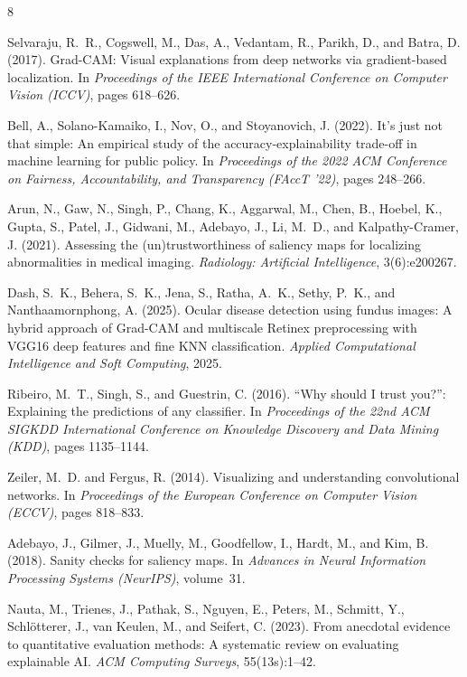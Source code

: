 \documentclass[12pt]{article}
\begin{document}
\begin{thebibliography}{8}

Selvaraju, R.~R., Cogswell, M., Das, A., Vedantam, R., Parikh, D., and
  Batra, D. (2017).
\newblock Grad-CAM: Visual explanations from deep networks via gradient-based
  localization.
\newblock In \emph{Proceedings of the IEEE International Conference on
  Computer Vision (ICCV)}, pages 618--626.

Bell, A., Solano-Kamaiko, I., Nov, O., and Stoyanovich, J. (2022).
\newblock It's just not that simple: An empirical study of the
  accuracy-explainability trade-off in machine learning for public policy.
\newblock In \emph{Proceedings of the 2022 ACM Conference on Fairness,
  Accountability, and Transparency (FAccT '22)}, pages 248--266.

Arun, N., Gaw, N., Singh, P., Chang, K., Aggarwal, M., Chen, B., Hoebel, K.,
  Gupta, S., Patel, J., Gidwani, M., Adebayo, J., Li, M.~D., and
  Kalpathy-Cramer, J. (2021).
\newblock Assessing the (un)trustworthiness of saliency maps for localizing
  abnormalities in medical imaging.
\newblock \emph{Radiology: Artificial Intelligence}, 3(6):e200267.

Dash, S.~K., Behera, S.~K., Jena, S., Ratha, A.~K., Sethy, P.~K., and
  Nanthaamornphong, A. (2025).
\newblock Ocular disease detection using fundus images: A hybrid approach of
  Grad-CAM and multiscale Retinex preprocessing with VGG16 deep features and
  fine KNN classification.
\newblock \emph{Applied Computational Intelligence and Soft Computing},
  2025.

Ribeiro, M.~T., Singh, S., and Guestrin, C. (2016).
\newblock ``Why should I trust you?'': Explaining the predictions of any
  classifier.
\newblock In \emph{Proceedings of the 22nd ACM SIGKDD International
  Conference on Knowledge Discovery and Data Mining (KDD)}, pages
  1135--1144.

Zeiler, M.~D. and Fergus, R. (2014).
\newblock Visualizing and understanding convolutional networks.
\newblock In \emph{Proceedings of the European Conference on Computer
  Vision (ECCV)}, pages 818--833.

Adebayo, J., Gilmer, J., Muelly, M., Goodfellow, I., Hardt, M., and Kim, B.
  (2018).
\newblock Sanity checks for saliency maps.
\newblock In \emph{Advances in Neural Information Processing Systems
  (NeurIPS)}, volume~31.

Nauta, M., Trienes, J., Pathak, S., Nguyen, E., Peters, M., Schmitt, Y.,
  Schlötterer, J., van Keulen, M., and Seifert, C. (2023).
\newblock From anecdotal evidence to quantitative evaluation methods: A
  systematic review on evaluating explainable AI.
\newblock \emph{ACM Computing Surveys}, 55(13s):1--42.

\end{thebibliography}
\end{document}
